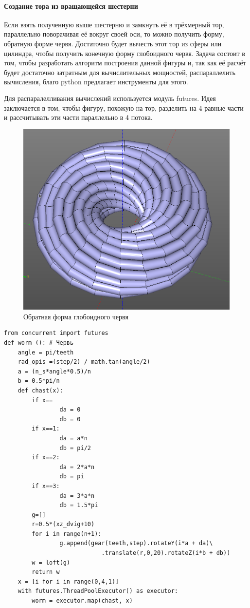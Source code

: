 \paragraph{Создание тора из вращающейся шестерни} Если взять полученную выше шестерню и замкнуть её в трёхмерный тор, параллельно поворачивая её вокруг своей оси, то можно получить форму, обратную форме червя. Достаточно будет вычесть этот тор из сферы или цилиндра, чтобы получить конечную форму глобоидного червя. Задача состоит в том, чтобы разработать алгоритм построения данной фигуры и, так как её расчёт будет достаточно затратным для вычислительных мощностей, распараллелить вычисления, благо python предлагает инструменты для этого. 

Для распаралелливания вычислений используется модуль futures. Идея заключается в том, чтобы фигуру, похожую на тор, разделить на 4 равные части и рассчитывать эти части параллельно в 4 потока. 
\begin{figure}[h]
	\centering
	\includegraphics[width=0.8\linewidth]{./image/worm_tor}
	\caption{Обратная форма глобоидного червя}
\end{figure} 

\begin{verbatim}
from concurrent import futures
def worm (): # Червь
    angle = pi/teeth
    rad_opis =(step/2) / math.tan(angle/2)
    a = (n_s*angle*0.5)/n
    b = 0.5*pi/n
    def chast(x):
        if x==
                da = 0
                db = 0
        if x==1:
                da = a*n
                db = pi/2
        if x==2:
                da = 2*a*n
                db = pi
        if x==3:
                da = 3*a*n
                db = 1.5*pi
        g=[]
        r=0.5*(xz_dvig+10)
        for i in range(n+1):
                g.append(gear(teeth,step).rotateY(i*a + da)\
                            .translate(r,0,20).rotateZ(i*b + db))
        w = loft(g)
        return w
    x = [i for i in range(0,4,1)]
    with futures.ThreadPoolExecutor() as executor:
        worm = executor.map(chast, x)
 \end{verbatim}



